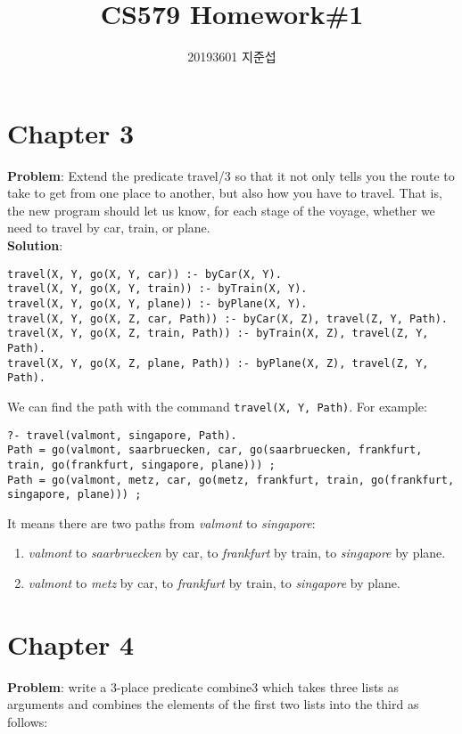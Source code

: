 \documentclass{article}
\author{20193601 지준섭}
\title{CS579 Homework\#1}
\begin{document}
\maketitle

\section{Chapter 3}
\textbf{Problem}: Extend the predicate travel/3 so that
it not only tells you the route to take to get from one place to another,
but also how you have to travel.
That is, the new program should let us know,
for each stage of the voyage,
whether we need to travel by car, train, or plane. \\

\noindent
\textbf{Solution}:
\begin{verbatim}
travel(X, Y, go(X, Y, car)) :- byCar(X, Y).
travel(X, Y, go(X, Y, train)) :- byTrain(X, Y).
travel(X, Y, go(X, Y, plane)) :- byPlane(X, Y).
travel(X, Y, go(X, Z, car, Path)) :- byCar(X, Z), travel(Z, Y, Path).
travel(X, Y, go(X, Z, train, Path)) :- byTrain(X, Z), travel(Z, Y, Path).
travel(X, Y, go(X, Z, plane, Path)) :- byPlane(X, Z), travel(Z, Y, Path).
\end{verbatim}

\noindent
We can find the path with the command \texttt{travel(X, Y, Path)}.
For example:

\begin{verbatim}
?- travel(valmont, singapore, Path).
Path = go(valmont, saarbruecken, car, go(saarbruecken, frankfurt, train, go(frankfurt, singapore, plane))) ;
Path = go(valmont, metz, car, go(metz, frankfurt, train, go(frankfurt, singapore, plane))) ;
\end{verbatim}

\noindent
It means there are two paths from \textit{valmont} to \textit{singapore}:
\begin{enumerate}
  \item \textit{valmont} to \textit{saarbruecken} by car,
    to \textit{frankfurt} by train, to \textit{singapore} by plane.
  \item \textit{valmont} to \textit{metz} by car,
    to \textit{frankfurt} by train, to \textit{singapore} by plane.
\end{enumerate}

\section{Chapter 4}
\textbf{Problem}: write a 3-place predicate combine3
which takes three lists as arguments and
combines the elements of the first two lists into the third as follows:
\end{document}
